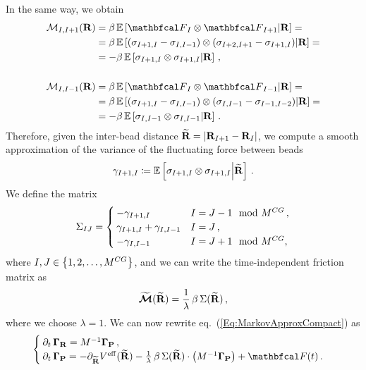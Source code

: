 \documentclass[10pt,a4paper]{book}
\theoremstyle{definition}
\begin{document}
\noindent
In the same way, we obtain
\begin{align*}
 \fricmat_{I,I+1}(\bfR) &= \beta\,\cexpval{\fprojbf_I \otimes \fprojbf_{I+1}}{\bfR} = \\
 &= \beta\,\cexpval{ (\sigma_{I+1,I}-\sigma_{I,I-1}) \otimes (\sigma_{I+2,I+1}-\sigma_{I+1,I}) }{\bfR} = \\
 &= -\beta\,\cexpval{ \sigma_{I+1,I} \otimes \sigma_{I+1,I} }{\bfR} \,, \\
 \\
 \fricmat_{I,I-1}(\bfR) &= \beta\,\cexpval{\fprojbf_I \otimes \fprojbf_{I-1}}{\bfR} = \\
 &= \beta\,\cexpval{ (\sigma_{I+1,I}-\sigma_{I,I-1}) \otimes (\sigma_{I,I-1}-\sigma_{I-1,I-2}) }{\bfR} = \\
 &= -\beta\,\cexpval{ \sigma_{I,I-1} \otimes \sigma_{I,I-1} }{\bfR} \,.
\end{align*}
Therefore, given the inter-bead distance $\widetilde{\mathbf{R}}=\lvert\mathbf{R}_{I+1}-\mathbf{R}_{I}\rvert$, we compute a smooth approximation of the variance of the fluctuating force between beads
\[
 \gamma_{I+1,I} \coloneqq \mathbb{E}\left[ { \sigma_{I+1,I} \otimes \sigma_{I+1,I} } \middle\vert { \widetilde{\mathbf{R}} } \right]\,.
\]
We define the matrix
\begin{equation*}
 \Sigma_{IJ} = \begin{cases}
    -\gamma_{I+1,I} & I=J-1 \mod {M^{CG}} \,, \\
    \gamma_{I+1,I} + \gamma_{I,I-1} & I=J \,, \\
    -\gamma_{I,I-1} & I=J+1 \mod {M^{CG}},
 \end{cases}
\end{equation*}
where $I,J \in \left\lbrace 1,2,\dots,M^{CG}\right\rbrace$, and we can write the time-independent friction matrix as 
\begin{equation}
\label{Eq:TridMat}
 \widetilde{\boldsymbol{\mathcal{M}}}(\widetilde{\mathbf{R}}) = \frac{1}{\lambda}\,\beta\,\Sigma(\widetilde{\mathbf{R}})\,,
\end{equation}
where we choose $\lambda = 1$. We can now rewrite eq.~(\ref{Eq:MarkovApproxCompact}) as
\begin{equation}
\label{Eq:MApCompactTrMat}
\begin{cases}
 \partial_t\,\Bphase{\bfR} = M^{-1}\Bphase{\bfP} \,, & \\
 \partial_t\,\Bphase{\bfP} = -\partial_{\widetilde{\bfR}}\Veff(\widetilde{\bfR}) 
                             - \frac{1}{\lambda}\, \beta\,\Sigma(\widetilde{\bfR}) \cdot \cip{M^{-1}\Bphase{\bfP}}
                             + \fprojbf(t) \,. &  
\end{cases}
\end{equation} 
\end{document}
